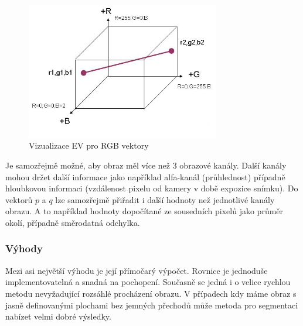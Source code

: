 \documentclass[czech, master, public, dept460, male, cpdeclaration, oneside]{diploma}
\begin{document}
\begin{figure}[H]
	\vspace*{+3.0mm}
	\centering
	\includegraphics[height=6cm]{Figures/explanatory/euclideanDistance3d.jpg}
	\caption{Vizualizace EV pro RGB vektory}
\end{figure}
\noindent
Je samozřejmě možné, aby obraz měl více než 3 obrazové kanály. Další kanály mohou držet další informace jako například alfa-kanál (průhlednost) případně hloubkovou informaci (vzdálenost pixelu od kamery v době expozice snímku).  Do vektorů $p$ a $q$ lze samozřejmě přiřadit i další hodnoty než jednotlivé kanály obrazu. A to například hodnoty dopočítané ze sousedních pixelů jako průměr okolí, případně směrodatná odchylka. 

\subsubsection{Výhody}
Mezi asi největší výhodu je její přímočarý výpočet. Rovnice je jednoduše implementovatelná a snadná na pochopení. Současně se jedná i o velice rychlou metodu nevyžadující rozsáhlé procházení obrazu. V případech kdy máme obraz s jasně definovanými plochami bez jemných přechodů může metoda pro segmentaci nabízet velmi dobré výsledky.\par
\end{document}
